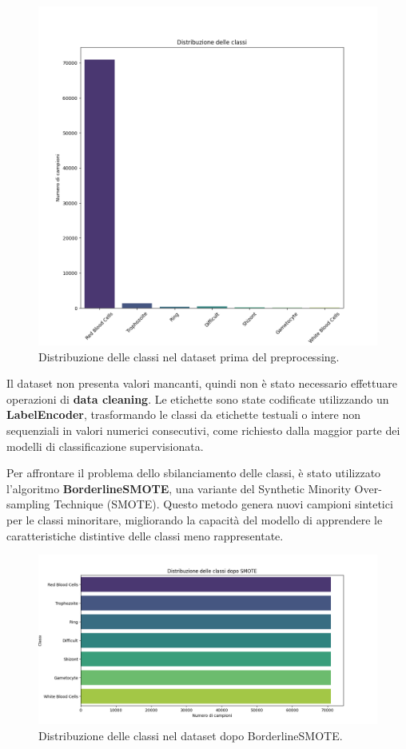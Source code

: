 \documentclass[minted, draw]{../tex/hebdomon}
\begin{document}
% 
\begin{figure}[H]
  \centering
  \includegraphics[width=.7\linewidth]{figures/class_distribution.png}
  \caption{Distribuzione delle classi nel dataset prima del preprocessing.}
  \label{fig:sbilanciamento}
\end{figure}
%

Il dataset non presenta valori mancanti, quindi non è stato necessario effettuare operazioni di \textbf{data cleaning}. Le etichette sono state codificate utilizzando un \textbf{LabelEncoder}, trasformando le classi da etichette testuali o intere non sequenziali in valori numerici consecutivi, come richiesto dalla maggior parte dei modelli di classificazione supervisionata.

Per affrontare il problema dello sbilanciamento delle classi, è stato utilizzato l'algoritmo \textbf{BorderlineSMOTE}, una variante del Synthetic Minority Over-sampling Technique (SMOTE). Questo metodo genera nuovi campioni sintetici per le classi minoritare, migliorando la capacità del modello di apprendere le caratteristiche distintive delle classi meno rappresentate.
% 
\begin{figure}[H]
  \centering
  \includegraphics[width=.9\linewidth]{figures/class_distribution_after_smote.png}
  \caption{Distribuzione delle classi nel dataset dopo BorderlineSMOTE.}
  \label{fig:BorderlineSMOTE}
\end{figure}
%
\end{document}
